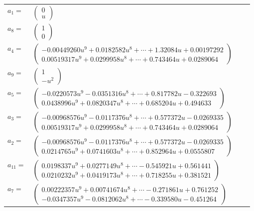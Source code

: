 \documentclass[1p]{elsarticle_modified}
\theoremstyle{definition}
\begin{document}
\begin{tabular}{m{7pt} m{180pt} m{7pt} m{180pt} }
\flushright $a_{1}=$&$\begin{pmatrix}0\\u\end{pmatrix}$ \\
\flushright $a_{8}=$&$\begin{pmatrix}1\\0\end{pmatrix}$ \\
\flushright $a_{4}=$&$\begin{pmatrix}-0.00449260 u^{9}+0.0182582 u^{8}+\cdots+1.32084 u+0.00197292\\0.00519317 u^{9}+0.0299958 u^{8}+\cdots+0.743464 u+0.0289064\end{pmatrix}$ \\
\flushright $a_{9}=$&$\begin{pmatrix}1\\- u^2\end{pmatrix}$ \\
\flushright $a_{5}=$&$\begin{pmatrix}-0.0220573 u^{9}-0.0351316 u^{8}+\cdots+0.817782 u-0.322693\\0.0438996 u^{9}+0.0820347 u^{8}+\cdots+0.685204 u+0.494633\end{pmatrix}$ \\
\flushright $a_{3}=$&$\begin{pmatrix}-0.00968576 u^{9}-0.0117376 u^{8}+\cdots+0.577372 u-0.0269335\\0.00519317 u^{9}+0.0299958 u^{8}+\cdots+0.743464 u+0.0289064\end{pmatrix}$ \\
\flushright $a_{2}=$&$\begin{pmatrix}-0.00968576 u^{9}-0.0117376 u^{8}+\cdots+0.577372 u-0.0269335\\0.0214765 u^{9}+0.0741603 u^{8}+\cdots+0.852964 u+0.0555807\end{pmatrix}$ \\
\flushright $a_{11}=$&$\begin{pmatrix}0.0198337 u^{9}+0.0277149 u^{8}+\cdots-0.545921 u+0.561441\\0.0210232 u^{9}+0.0419173 u^{8}+\cdots+0.718255 u+0.381521\end{pmatrix}$ \\
\flushright $a_{7}=$&$\begin{pmatrix}0.00222357 u^{9}+0.00741674 u^{8}+\cdots-0.271861 u+0.761252\\-0.0347357 u^{9}-0.0812062 u^{8}+\cdots-0.339580 u-0.451264\end{pmatrix}$ \\

\end{tabular}
\end{document}
